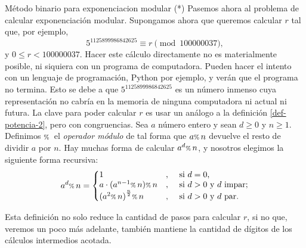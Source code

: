 \begin{section}{Método binario para exponenciacion modular (*)}
    Pasemos ahora al problema de calcular exponenciación modular. Supongamos ahora que queremos calcular $r$ tal que, por ejemplo,  
$$
    5^{1125899986842625} \equiv r \pmod{100000037},
$$
 y $0 \le r < 100000037$. Hacer este cálculo  directamente no es materialmente posible, ni siquiera con un programa de computadora. Pueden hacer el intento con un lenguaje de programación, Python por ejemplo, y verán que el programa no termina. Esto se debe a que $5^{1125899986842625}$  es un número inmenso  cuya representación no cabría en la memoria de ninguna computadora ni actual ni futura. La clave  para poder calcular $r$ es usar un análogo a la definición \eqref{def-potencia-2}, pero con congruencias. Sea $a$ número entero y sean $d \ge 0$ y $n \ge 1$. Definimos ${\scriptstyle \%}\,$ el \textit{operador módulo} de tal forma que $a {\scriptstyle \%}\, n$ devuelve el resto de dividir $a$ por $n$. Hay muchas forma de calcular $a^d {\scriptstyle \%}\, n$, y nosotros elegimos  la siguiente forma recursiva:
 \begin{equation}\label{def-potencia-mod-1}
    a^d \modulo n = \left\{
    \begin{matrix*}[l]
        1&,&\text{ si $d = 0$,} \\
        a \cdot (a^{n-1} \modulo n) \modulo n &,&\text{  si $d > 0$ y  $d$ impar;} \\
        {(a^2 \modulo n)}^{\frac{n}{2}}\modulo n&,&\text{  si $d > 0$ y  $d$ par.}
    \end{matrix*}\right.   
\end{equation}

  Esta definición no solo reduce la cantidad de pasos para calcular $r$, si no que, veremos un poco más adelante, también mantiene la cantidad de dígitos de los cálculos intermedios acotada.


\end{section}
